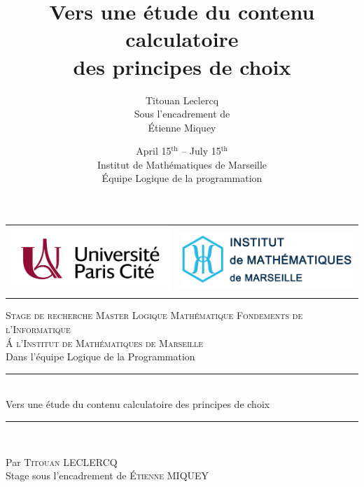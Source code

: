 \documentclass{article}
\title{Vers une étude du contenu calculatoire\\ des principes de choix}
\author{Titouan Leclercq\\ Sous l'encadrement de\\ \'Etienne Miquey}
\date{April 15$^{\mathrm{th}}$ -- July 15$^{\mathrm{th}}$ \\
Institut de Mathématiques de Marseille \\
\'Equipe Logique de la programmation}
\begin{document}
\begin{titlepage}
		\begin{center}
            \begin{tabular}{c@{\hskip 7cm}c@{\hskip 1cm}}
                \includegraphics[height=2.5cm]{UniversiteParisCite_logo_horizontal_couleur_CMJN.jpg} &
                \hspace{-5cm}\includegraphics[height=2.3cm]{logo_i2m_color_hex_horizontal_3lines_regular_72dpi.png}
            \end{tabular}
        \end{center}
    
        \begin{center}
        
\vspace*{.03\textheight}
\textsc{\LARGE Stage de recherche Master Logique Mathématique Fondements de l'Informatique\\
        \LARGE \'A l'Institut de Mathématiques de Marseille}\\[0.2cm] %
        \large Dans l'équipe Logique de la Programmation\\
  
            \vfill
 
            \rule{\textwidth}{0.8pt} \\ %
            \vspace{10pt}
             { \LARGE Vers une étude du contenu calculatoire des principes de choix} %
             \vspace{10pt}
             \rule{\textwidth}{0.8pt} \\ %
        \end{center}
        
        \vfill
        \begin{center}
            Par \textsc{\Large Titouan LECLERCQ}\\[1cm] 
            Stage sous l'encadrement de \textsc{\large \'Etienne MIQUEY}\\[0.2cm]
        \end{center}
        
    \end{titlepage}
\end{document}
